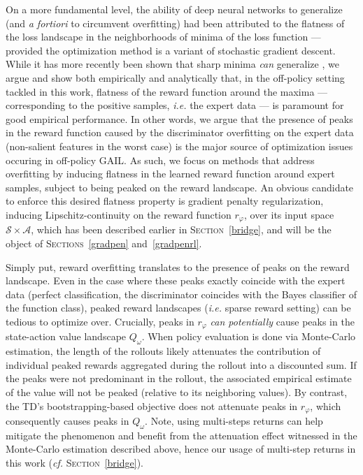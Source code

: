 On a more fundamental level,
the ability of deep neural networks
to generalize (and \textit{a fortiori} to circumvent overfitting)
had been attributed to the flatness of the loss landscape in
the neighborhoods of minima of the loss function \cite{Hochreiter1997-ft,Keskar2017-dg}
--- provided the optimization method is a variant of stochastic gradient descent.
While it has more recently been shown that sharp minima \textit{can} generalize \cite{Dinh2017-iz},
we argue and show both empirically and analytically that,
in the off-policy setting tackled in this work,
flatness of the reward function around the maxima
--- corresponding to the positive samples, \textit{i.e.} the expert data ---
is paramount for good empirical performance.
In other words, we argue that the presence of peaks in the reward function
caused by the discriminator overfitting on the expert data
(non-salient features in the worst case)
is the major source of optimization issues occuring in off-policy GAIL.
As such, we focus on methods that address overfitting by inducing flatness in the
learned reward function around expert samples, subject to being peaked on the
reward landscape.
An obvious candidate to enforce this desired flatness property is
gradient penalty regularization,
inducing Lipschitz-continuity on the reward function $r_\varphi$,
over its input space $\mathcal{S} \times \mathcal{A}$,
which has been described earlier in \textsc{Section}~\ref{bridge},
and will be the object of \textsc{Sections}~\ref{gradpen} and~\ref{gradpenrl}.

Simply put, reward overfitting translates to the presence of peaks on the reward landscape.
Even in the case where these peaks exactly coincide with the expert data
(perfect classification, the discriminator coincides with the Bayes classifier
of the function class),
peaked reward landscapes (\textit{i.e.} sparse reward setting) can be tedious to optimize over.
Crucially, peaks in $r_\varphi$ \emph{can potentially}
cause peaks in the state-action value landscape $Q_\omega$.
When policy evaluation is done via Monte-Carlo estimation,
the length of the rollouts likely attenuates the contribution of individual peaked rewards
aggregated during the rollout into a discounted sum.
If the peaks were not predominant in the rollout, the associated empirical estimate of the value
will not be peaked (relative to its neighboring values).
By contrast, the TD's bootstrapping-based objective does not attenuate peaks in $r_\varphi$,
which consequently causes peaks in $Q_\omega$.
Note, using multi-steps returns \cite{Peng1996-xn}
can help mitigate the phenomenon and benefit from the
attenuation effect witnessed in the Monte-Carlo estimation described above,
hence our usage of multi-step returns in this work (\textit{cf.} \textsc{Section}~\ref{bridge}).

